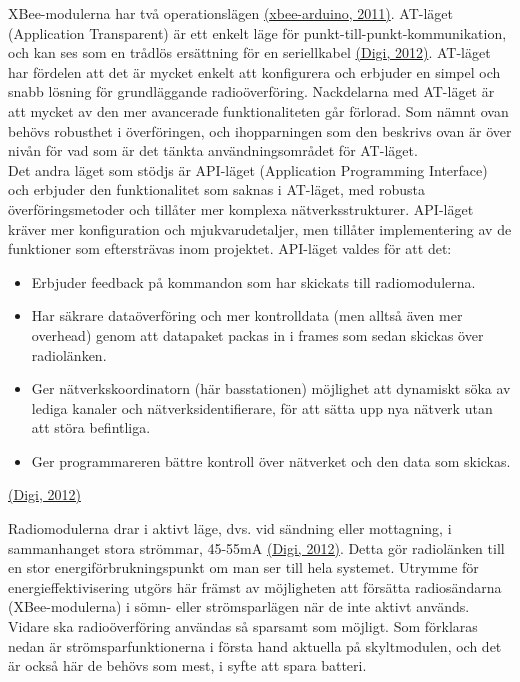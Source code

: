 \documentclass[a4paper,11pt]{article}
\begin{document}
XBee-modulerna har två operationslägen \hyperref[xbeearduino]{(xbee-arduino, 2011)}. AT-läget (Application Transparent) är ett enkelt läge för punkt-till-punkt-kommunikation, och kan ses som en trådlös ersättning för en seriellkabel \hyperref[digi]{(Digi, 2012)}. AT-läget har fördelen att det är mycket enkelt att konfigurera och erbjuder en simpel och snabb lösning för grundläggande radioöverföring. Nackdelarna med AT-läget är att mycket av den mer avancerade funktionaliteten går förlorad. Som nämnt ovan behövs robusthet i överföringen, och ihopparningen som den beskrivs ovan är över nivån för vad som är det tänkta användningsområdet för AT-läget. \\

Det andra läget som stödjs är API-läget (Application Programming Interface) och erbjuder den funktionalitet som saknas i AT-läget, med robusta överföringsmetoder och tillåter mer komplexa nätverksstrukturer. API-läget kräver mer konfiguration och mjukvarudetaljer, men tillåter implementering av de funktioner som eftersträvas inom projektet. API-läget valdes för att det:
	
	\begin{itemize}
	\item Erbjuder feedback på kommandon som har skickats till radiomodulerna.
    	\item Har säkrare dataöverföring och mer kontrolldata (men alltså även mer overhead) genom att datapaket packas in i frames som sedan skickas över radiolänken.
    	\item Ger nätverkskoordinatorn (här basstationen) möjlighet att dynamiskt söka av lediga kanaler och nätverksidentifierare, för att sätta upp nya nätverk utan att störa befintliga.
    	\item Ger programmareren bättre kontroll över nätverket och den data som skickas.
    	\end{itemize}
\hyperref[digi]{(Digi, 2012)}
    	
Radiomodulerna drar i aktivt läge, dvs. vid sändning eller mottagning, i sammanhanget stora strömmar, 45-55mA \hyperref[digi]{(Digi, 2012)}. Detta gör radiolänken till en stor energiförbrukningspunkt om man ser till hela systemet. Utrymme för energieffektivisering utgörs här främst av möjligheten att försätta radiosändarna (XBee-modulerna) i sömn- eller strömsparlägen när de inte aktivt används. Vidare ska radioöverföring användas så sparsamt som möjligt. Som förklaras nedan är strömsparfunktionerna i första hand aktuella på skyltmodulen, och det är också här de behövs som mest, i syfte att spara batteri. \\
\end{document}
